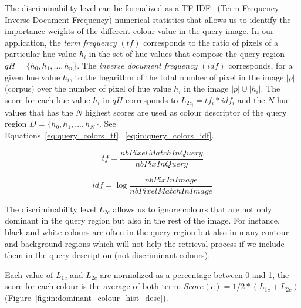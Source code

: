 The discriminability level can be formalized as a TF-IDF~\cite{salton1986introduction} (Term Frequency - Inverse Document Frequency) numerical statistics that allows us to identify the importance weights of the different colour value in the query image.
In our application, the {\it term frequency} $(tf)$ corresponds to the ratio of pixels of a particular hue value $h_i$ in the set of hue values that compose the query region $qH=\{h_0, h_1,...,h_n\}$.%
The {\it inverse document frequency} $(idf)$ corresponds, for a given hue value $h_i$, to the logarithm of the total number of pixel in the image $|p|$ (corpus) over the number of pixel of hue value $h_i$ in the image $|p| \cup |h_i|$.
The score for each hue value $h_i$ in $qH$ corresponds to $L_{2c_i} = tf_i * idf_i$ and the $N$ hue values that has the $N$ highest scores are used as colour descriptor of the query region $D=\{h_0,h_1,...,h_N\}$.
See Equations~\ref{eq:query_colors_tf},~\ref{eq:in:query_colors_idf}.%




\begin{equation}
   tf = \frac{nbPixelMatchInQuery}{nbPixInQuery}
   \label{eq:query_colors_tf}  
  \end{equation}

\begin{equation}
 idf = \log \frac{nbPixInImage}{nbPixelMatchInImage}
   \label{eq:in:query_colors_idf}  
  \end{equation}

The discriminability level $L_{2c}$ allows us to ignore colours that are not only dominant in the query region but also in the rest of the image.
For instance, black and white colours are often in the query region but also in many contour and background regions which will not help the retrieval process if we include them in the query description (not discriminant colours).

Each value of $L_{1c}$ and $L_{2c}$ are normalized as a percentage between 0 and 1, the score for each colour is the average of both term: $Score(c) = 1/2 * (L_{1c} + L_{2c})$ (Figure~\ref{fig:in:dominant_colour_hist_desc}).


